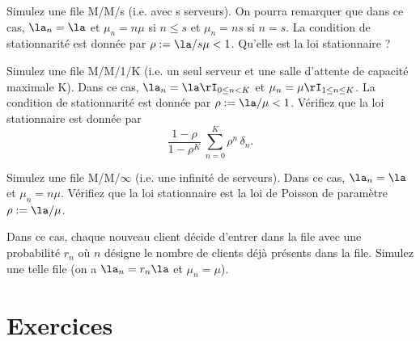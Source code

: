 \begin{exo}
  Simulez une file M/M/s (i.e. avec s serveurs).  On pourra remarquer
  que dans ce cas, $\la_n=\la$ et $\mu_n=n\mu$ si $n\leq s$ et
  $\mu_n=ns$ si $n=s$.  La condition de stationnarité est donnée par
  $\rho:=\la/s\mu<1$. Qu'elle est la loi stationnaire ?
\end{exo}

\begin{exo}
  Simulez une file M/M/1/K (i.e. un seul serveur et une salle
  d'attente de capacité maximale K).  Dans ce cas, $\la_n=\la
  \rI_{0\leq n < K}$ et $\mu_n=\mu \rI_{1\leq n \leq K}$.  La
  condition de stationnarité est donnée par $\rho:=\la/\mu<1$.
  Vérifiez que la loi stationnaire est donnée par
  $$
  \frac{1-\rho}{1-\rho^{K}}\,\sum_{n=0}^K \rho^n\,\delta_n.
  $$
\end{exo}

\begin{exo}
  Simulez une file M/M/$\infty$ (i.e. une infinité de serveurs).  Dans
  ce cas, $\la_n=\la$ et $\mu_n=n\mu$.  Vérifiez que la loi
  stationnaire est la loi de Poisson de paramètre $\rho:=\la/\mu$.
\end{exo}

\begin{exo}
  Dans ce cas, chaque nouveau client décide d'entrer dans la file avec
  une probabilité $r_n$ où $n$ désigne le nombre de clients déjà
  présents dans la file. Simulez une telle file (on a $\la_n=r_n\la$
  et $\mu_n=\mu$).
\end{exo}

%
\section{Exercices}
%

